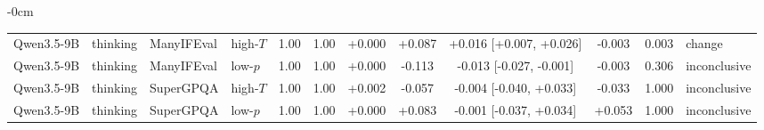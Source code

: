 \begin{table}[H]
\begin{adjustwidth}{-\extralength}{0cm}
\begin{tabular}{llllcccccccl}
Qwen3.5-9B & thinking & ManyIFEval & high-$T$ & 1.00 & 1.00 & +0.000 & +0.087 & +0.016 [+0.007, +0.026] & -0.003 & 0.003 & change \tabularnewline
Qwen3.5-9B & thinking & ManyIFEval & low-$p$ & 1.00 & 1.00 & +0.000 & -0.113 & -0.013 [-0.027, -0.001] & -0.003 & 0.306 & inconclusive \tabularnewline
Qwen3.5-9B & thinking & SuperGPQA & high-$T$ & 1.00 & 1.00 & +0.002 & -0.057 & -0.004 [-0.040, +0.033] & -0.033 & 1.000 & inconclusive \tabularnewline
Qwen3.5-9B & thinking & SuperGPQA & low-$p$ & 1.00 & 1.00 & +0.000 & +0.083 & -0.001 [-0.037, +0.034] & +0.053 & 1.000 & inconclusive \tabularnewline
\bottomrule
\end{tabular}
\end{adjustwidth}
\end{table}
